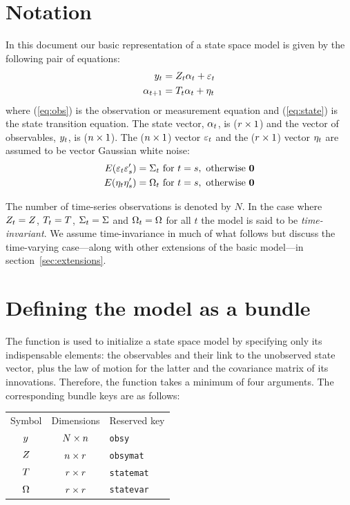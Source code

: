 \section{Notation}
\label{sec:notation}

In this document our basic representation of a state space model is
given by the following pair of equations:
%
\begin{align}
  \label{eq:obs}
  y_t &= Z_t \alpha_t + \varepsilon_t \\
  \label{eq:state}
  \alpha_{t+1} &= T_t \alpha_t + \eta_t
\end{align}
%
where (\ref{eq:obs}) is the observation or measurement equation and
(\ref{eq:state}) is the state transition equation.  The state vector,
$\alpha_{t}$, is ($r \times 1$) and the vector of observables,
$y_t$, is ($n \times 1$).  The ($n \times 1$) vector
$\varepsilon_t$ and the ($r \times 1$) vector $\eta_t$ are
assumed to be vector Gaussian white noise:
%
\begin{align*}
E(\varepsilon_t \varepsilon_s') &= \Sigma_t \mbox{ for } t = s,
    \mbox{ otherwise } \mathbf{0} \\
E(\eta_t \eta_s') &= \Omega_t \mbox{ for } t = s,
    \mbox{ otherwise } \mathbf{0}
\end{align*}

The number of time-series observations is denoted by $N$.  In the case
where $Z_t = Z$, $T_t = T$,
$\Sigma_t = \Sigma$ and $\Omega_t = \Omega$ for all $t$
the model is said to be \emph{time-invariant}. We assume
time-invariance in much of what follows but discuss the time-varying
case---along with other extensions of the basic model---in
section~\ref{sec:extensions}.

\section{Defining the model as a bundle}
\label{sec:setup}

The  function is used to initialize a state space model
by specifying only its indispensable elements: the observables and
their link to the unobserved state vector, plus the law of motion for
the latter and the covariance matrix of its innovations. Therefore,
the function takes a minimum of four arguments. The corresponding
bundle keys are as follows:

\begin{center}
\begin{tabular}{ccl}
Symbol & Dimensions & Reserved key \\[6pt]
$y$    & $N \times n$ & \texttt{obsy}\\
$Z$   & $n \times r$ & \texttt{obsymat}\\
$T$  & $r \times r$ & \texttt{statemat}\\
$\Omega$  & $r \times r$ & \texttt{statevar}\\
\end{tabular}
\end{center}

